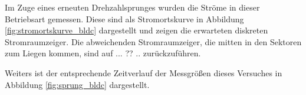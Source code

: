 \noindent Im Zuge eines erneuten Drehzahlsprunges wurden die Ströme in dieser Betriebsart gemessen. Diese sind als Stromortskurve in Abbildung \ref{fig:stromortskurve_bldc} dargestellt und zeigen die erwarteten diskreten Stromraumzeiger. Die abweichenden Stromraumzeiger, die mitten in den Sektoren zum Liegen kommen, sind auf ... ?? .. zurückzuführen.




\noindent Weiters ist der entsprechende Zeitverlauf der Messgrößen dieses Versuches in Abbildung \ref{fig:sprung_bldc} dargestellt.
